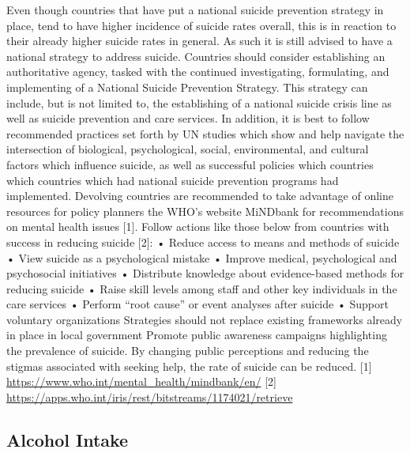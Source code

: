 \documentclass[]{article}
\begin{document}
Even though countries that have put a national suicide prevention
strategy in place, tend to have higher incidence of suicide rates
overall, this is in reaction to their already higher suicide rates in
general. As such it is still advised to have a national strategy to
address suicide. Countries should consider establishing an authoritative
agency, tasked with the continued investigating, formulating, and
implementing of a National Suicide Prevention Strategy. This strategy
can include, but is not limited to, the establishing of a national
suicide crisis line as well as suicide prevention and care services. In
addition, it is best to follow recommended practices set forth by UN
studies which show and help navigate the intersection of biological,
psychological, social, environmental, and cultural factors which
influence suicide, as well as successful policies which countries which
countries which had national suicide prevention programs had
implemented. Devolving countries are recommended to take advantage of
online resources for policy planners the WHO's website MiNDbank for
recommendations on mental health issues {[}1{]}. Follow actions like
those below from countries with success in reducing suicide {[}2{]}: •
Reduce access to means and methods of suicide • View suicide as a
psychological mistake • Improve medical, psychological and psychosocial
initiatives • Distribute knowledge about evidence-based methods for
reducing suicide • Raise skill levels among staff and other key
individuals in the care services • Perform ``root cause'' or event
analyses after suicide • Support voluntary organizations Strategies
should not replace existing frameworks already in place in local
government Promote public awareness campaigns highlighting the
prevalence of suicide. By changing public perceptions and reducing the
stigmas associated with seeking help, the rate of suicide can be
reduced. {[}1{]} \url{https://www.who.int/mental_health/mindbank/en/}
{[}2{]} \url{https://apps.who.int/iris/rest/bitstreams/1174021/retrieve}

\subsection{Alcohol Intake}\label{alcohol-intake}
\end{document}

